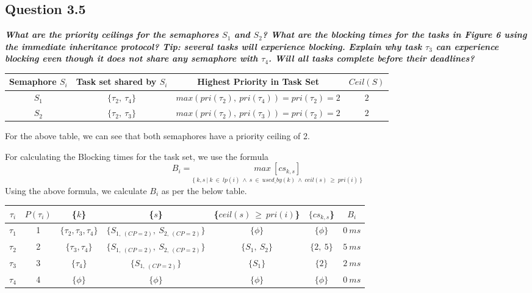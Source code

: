 \documentclass[oneside,a4paper]{article}
\begin{document}
\subsection*{\normalsize{Question 3.5}}
\textit{\textbf{What are the priority ceilings for the semaphores $S_1$ and $S_2$? What are the blocking times for the tasks in Figure 6 using the immediate inheritance protocol? Tip: several tasks will experience blocking. Explain why task $\tau_3$ can experience blocking even though it does not share any semaphore with $\tau_4$. Will all tasks complete before their deadlines?}}\par
\begin{center}
\begin{tabular}{| c | c | c | c |}
\hline
\textbf{Semaphore $S_i$} & \textbf{Task set shared by $S_i$} & \textbf{Highest Priority in Task Set} & \textbf{$Ceil(S)$}\\
\hline
$S_1$ & $\{\tau_2,\ \tau_4\}$ & $max(pri(\tau_2),\ pri(\tau_4)) = pri(\tau_2) = 2$ & $2$\\
$S_2$ & $\{\tau_2,\ \tau_3\}$ & $max(pri(\tau_2),\ pri(\tau_3)) = pri(\tau_2) = 2$ & $2$\\
\hline
\end{tabular}
\end{center}\par
For the above table, we can see that both semaphores have a priority ceiling of 2. \par
For calculating the Blocking times for the task set, we use the formula
$$B_i = \underset{ \{\ k,s\ \vert\ k\ \in\ lp(i)\ \wedge\ s\ \in\ used\_by(k)\ \wedge\ ceil(s)\ \geq\ pri(i)\ \} }{max\ [cs_{k,s}]}$$
Using the above formula, we calculate $B_i$ as per the below table.
\begin{center}
\begin{tabular}{| c | c | c | c | c | c | c |}
\hline
\textbf{$\tau_i$} & $P(\tau_i)$ &\textbf{\{$k$\}} & \textbf{\{$s$\}} & \textbf{\{$ceil(s)\ \geq\ pri(i)$\}} & \textbf{$\{cs_{k,s}$\}}& $B_i$ \\
\hline
$\tau_1$ & 1 & $\{ \tau_2, \tau_3, \tau_4\}$ & $\{S_{1,\ (CP = 2)},\ S_{2,\ (CP = 2)}\}$ & $\{\phi\}$ &$\{\phi\}$& $0\ ms$\\
$\tau_2$ & 2 & $\{ \tau_3, \tau_4\}$ & $\{S_{1,\ (CP = 2)},\ S_{2,\ (CP = 2)}\}$ & $\{S_1,\ S_2\}$ &$\{2,\ 5\}$& $5\ ms$\\
$\tau_3$ & 3 & $\{ \tau_4\}$ & $\{S_{1,\ (CP = 2)}\}$ & $\{S_1\}$ &$\{2\}$ & $2\ ms$\\
$\tau_4$ & 4 & $\{ \phi \}$ & $\{ \phi \}$ & $\{ \phi \}$ & $\{ \phi \}$ & $0\ ms$\\
\hline
\end{tabular}
\end{center}\par
\end{document}
